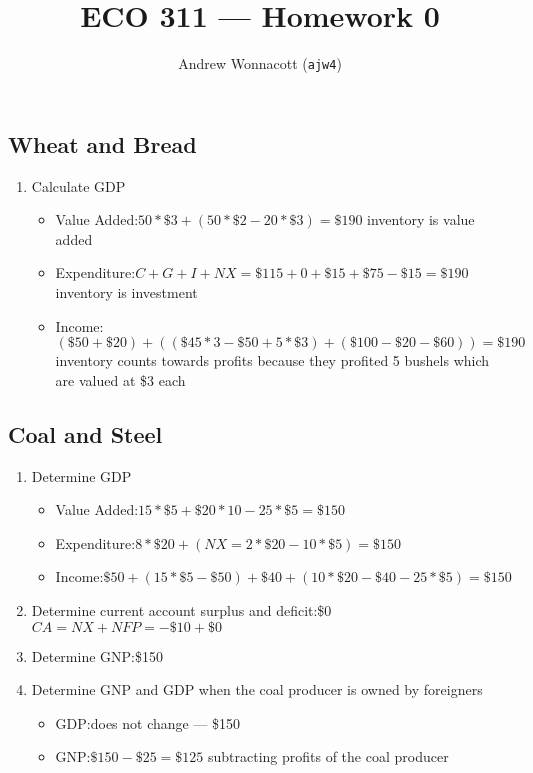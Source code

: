 \documentclass{pset}
\title{ECO 311 --- Homework 0}
\author{Andrew Wonnacott (\texttt{ajw4})}
\begin{document}
\maketitle
\subsection{Wheat and Bread}
\begin{enumerate}
  \item Calculate GDP
    \begin{itemize}
    \item Value Added:\@ \( 50*\$3 + (50*\$2 - 20*\$3) = \$190 \)
      {\color{red} inventory is value added}
    \item Expenditure:\@ \( C + G + I + NX = \$115 + 0 + \$15 + \$75 - \$15 = \$190 \)
      {\color{red} inventory is investment}
    \item Income:\@ \( (\$50 + \$20) + ((\$45 * 3 - \$50 + 5*\$3) + (\$100 - \$20 - \$60)) = \$190 \)
      \\{\color{red} inventory counts towards profits because they profited 5 bushels which are valued at \$3 each}
    \end{itemize}
  \end{enumerate}
\subsection{Coal and Steel}
\begin{enumerate}
\item Determine GDP
  \begin{itemize}
    \item Value Added:\@ \( 15*\$5 + \$20*10-25*\$5= \$150 \)
    \item Expenditure:\@ \( 8 * \$20 + (NX = 2 * \$20 - 10 * \$5) = \$150 \)
    \item Income:\@ \( \$50 + (15 * \$5 - \$50) + \$40 + (10 * \$20 - \$40 - 25 * \$5) = \$150\)
    \end{itemize}
  \item Determine current account surplus and deficit:\@ \$0
    \\{\color{red} \( CA = NX + NFP = -\$10 + \$0\)}
  \item Determine GNP:\@ \$150
  \item Determine GNP and GDP when the coal producer is owned by foreigners
    \begin{itemize}
    \item GDP:\@ does not change --- \$150
    \item GNP:\@ \( \$150 - \$25 = \$125 \) subtracting profits of the coal producer
    \end{itemize}
\end{enumerate}
\end{document}
